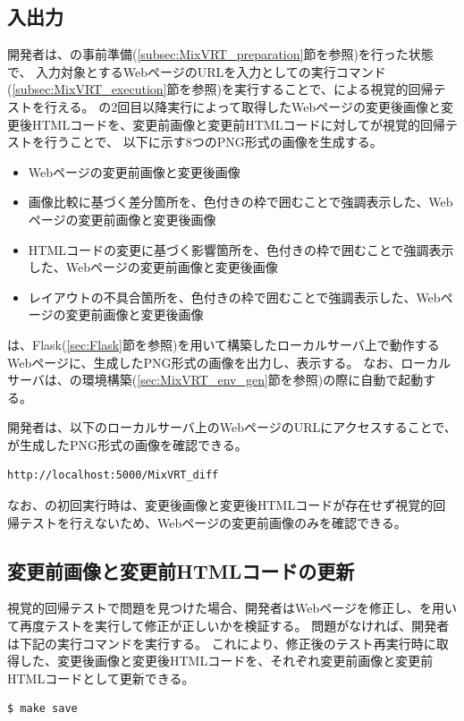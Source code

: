 \subsection{入出力}\label{subsec:MixVRT_IO}
開発者は、\toolName の事前準備(\ref{subsec:MixVRT_preparation}節を参照)を行った状態で、
入力対象とするWebページのURLを入力として\toolName の実行コマンド(\ref{subsec:MixVRT_execution}節を参照)を実行することで、\toolName による視覚的回帰テストを行える。
\toolName の2回目以降実行によって取得したWebページの変更後画像と変更後HTMLコードを、変更前画像と変更前HTMLコードに対して\toolName が視覚的回帰テストを行うことで、
以下に示す8つのPNG形式の画像を生成する。
\begin{itemize}
    \item Webページの変更前画像と変更後画像
    \item 画像比較に基づく差分箇所を、色付きの枠で囲むことで強調表示した、Webページの変更前画像と変更後画像
    \item HTMLコードの変更に基づく影響箇所を、色付きの枠で囲むことで強調表示した、Webページの変更前画像と変更後画像
    \item レイアウトの不具合箇所を、色付きの枠で囲むことで強調表示した、Webページの変更前画像と変更後画像
\end{itemize}
\toolName は、Flask(\ref{sec:Flask}節を参照)を用いて構築したローカルサーバ上で動作するWebページに、生成したPNG形式の画像を出力し、表示する。
なお、ローカルサーバは、\toolName の環境構築(\ref{sec:MixVRT_env_gen}節を参照)の際に自動で起動する。
\par
開発者は、以下のローカルサーバ上のWebページのURLにアクセスすることで、\toolName が生成したPNG形式の画像を確認できる。
\begin{lstlisting}[label=list:command3,frame=none,numbers=none,basicstyle={\normalsize \ttfamily \color[gray]{.15}}]
    http://localhost:5000/MixVRT_diff
   \end{lstlisting}
なお、\toolName の初回実行時は、変更後画像と変更後HTMLコードが存在せず視覚的回帰テストを行えないため、Webページの変更前画像のみを確認できる。

\subsection{変更前画像と変更前HTMLコードの更新}\label{subsec:MixVRT_evaluate}
視覚的回帰テストで問題を見つけた場合、開発者はWebページを修正し、\toolName を用いて再度テストを実行して修正が正しいかを検証する。
問題がなければ、開発者は下記の実行コマンドを実行する。
これにより、修正後のテスト再実行時に取得した、変更後画像と変更後HTMLコードを、それぞれ変更前画像と変更前HTMLコードとして更新できる。
\begin{lstlisting}[label=list:command2,frame=none,numbers=none,basicstyle={\normalsize \ttfamily \color[gray]{.15}}]
    $ make save
\end{lstlisting}

